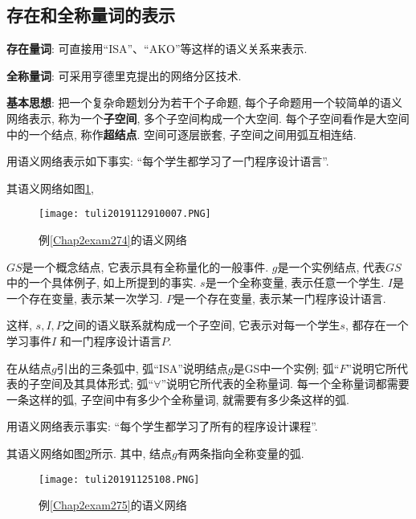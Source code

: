 \subsection{存在和全称量词的表示}
\begin{center}
\begin{minipage}{0.9\textwidth}
\textcolor[rgb]{0,0,1}{\textbf{存在量词}}: 可直接用“ISA”、“AKO”等这样的语义关系来表示.

\textcolor[rgb]{0,0,1}{\textbf{全称量词}}: 可采用亨德里克提出的网络分区技术.

\textcolor[rgb]{0,0,1}{\textbf{基本思想}}: 把一个复杂命题划分为若干个子命题, 每个子命题用一个较简单的语义网络表示, 称为一个\textbf{子空间}, 多个子空间构成一个大空间.
每个子空间看作是大空间中的一个结点, 称作\textbf{超结点}. 空间可逐层嵌套, 子空间之间用弧互相连结.
\end{minipage}
\end{center}

\begin{example}\label{Chap2exam274}
用语义网络表示如下事实: “每个学生都学习了一门程序设计语言”.
\end{example}
其语义网络如图\ref{AI32fig10007},
\begin{figure}[H]
\centering
\texttt{[image: tuli2019112910007.PNG]}
\caption{例\ref{Chap2exam274}的语义网络}
\label{AI32fig10007}
\end{figure}
\begin{flushleft}
      $GS$是一个概念结点, 它表示具有全称量化的一般事件.
      $g$是一个实例结点, 代表$GS$中的一个具体例子, 如上所提到的事实.
      $s$是一个全称变量, 表示任意一个学生.
      $I$是一个存在变量, 表示某一次学习.
      $P$是一个存在变量, 表示某一门程序设计语言.

      这样, $s,I,P$之间的语义联系就构成一个子空间, 它表示对每一个学生$s$, 都存在一个学习事件$I$ 和一门程序设计语言$P$.
\end{flushleft}
在从结点$g$引出的三条弧中, 弧“ISA”说明结点$g$是GS中一个实例; 弧“$F$”说明它所代表的子空间及其具体形式; 弧“$\forall$”说明它所代表的全称量词.
每一个全称量词都需要一条这样的弧, 子空间中有多少个全称量词, 就需要有多少条这样的弧.
\begin{example}\label{Chap2exam275}
用语义网络表示事实: “每个学生都学习了所有的程序设计课程”.
\end{example}
其语义网络如图\ref{AI32fig1008}所示. 其中, 结点$g$有两条指向全称变量的弧.
\begin{figure}[H]
\centering
\texttt{[image: tuli20191125108.PNG]}
\caption{例\ref{Chap2exam275}的语义网络}
\label{AI32fig1008}
\end{figure}

